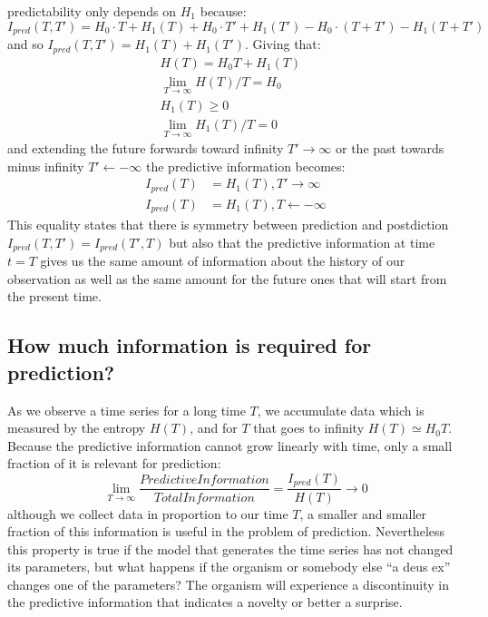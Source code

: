  predictability only depends on $H_1$ because:
\begin{equation}
I_{pred}(T,T')=H_0\cdot T + H_1(T) +H_0\cdot T' + H_1(T') -H_0\cdot (T+T')-H_1(T+T')
\end{equation}
and so $I_{pred}(T,T')=H_1(T)+H_1(T')$. Giving that:
\begin{eqnarray}
H(T)=H_0 T + H_1(T)& \\
\lim_{T\to\infty} H(T)/T=H_0&\\
H_1(T)\geqslant 0&\\
\lim_{T\to\infty} H_1(T)/T=0&
\end{eqnarray}
and extending the future forwards toward infinity $T' \rightarrow \infty$ or the
 past towards minus infinity $T' \leftarrow -\infty$ the predictive information becomes:
\begin{eqnarray}
I_{pred}(T)&=H_1(T), T' \rightarrow \infty\\
I_{pred}(T)&=H_1(T), T \leftarrow -\infty
\end{eqnarray}
This equality states that there is symmetry between prediction and postdiction
 $I_{pred}(T,T')=I_{pred}(T',T)$ but also that the predictive information at
time $t=T$ gives us the same amount of information about the history of our
observation as well as the same amount for the future ones that will start from
 the present time.
\subsection{How much information is required for prediction? \label{Appendix:InfoForPrediction}}

As we observe a time series for a long time $T$, we accumulate data which is measured
 by the entropy $H(T)$, and for $T$ that goes to infinity $H(T)\simeq H_0 T$.
Because the predictive information cannot grow linearly with time, only a small
 fraction of it is relevant for prediction:
\begin{equation}
\lim_{T\to\infty}\frac{PredictiveInformation}{TotalInformation}=\frac{I_{pred}(T)}{H(T)} \rightarrow 0
\end{equation}
although we collect data in proportion to our time $T$, a smaller and smaller fraction
 of this information is useful in the problem of prediction. Nevertheless this
property is true if the model that generates the time series has not changed its
 parameters, but what happens if the organism or somebody else ``a deus ex''
changes one of the parameters? The organism will experience a discontinuity
in the predictive information that indicates a novelty or better a surprise.
 

